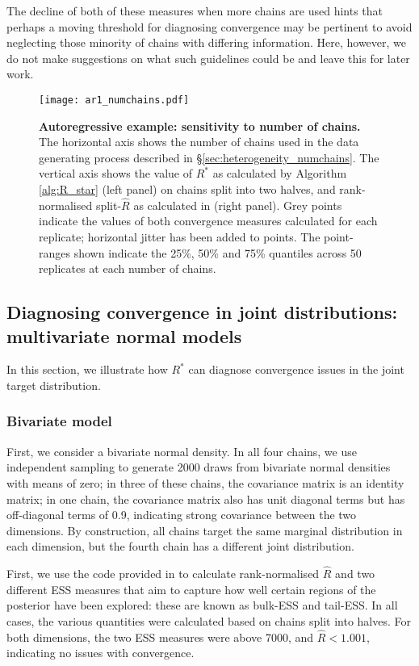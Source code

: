 \documentclass{article}
\begin{document}
The decline of both of these measures when more chains are used hints that perhaps a moving threshold for diagnosing convergence may be pertinent to avoid neglecting those minority of chains with differing information. Here, however, we do not make suggestions on what such guidelines could be and leave this for later work.

\begin{figure}[!htb]
	\centerline{\texttt{[image: ar1\_numchains.pdf]}}
	\caption{\textbf{Autoregressive example: sensitivity to number of chains.} The horizontal axis shows the number of chains used in the data generating process described in \S\ref{sec:heterogeneity_numchains}. The vertical axis shows the value of $R^*$ as calculated by Algorithm \ref{alg:R_star} (left panel) on chains split into two halves, and rank-normalised split-$\widehat{R}$ as calculated in \cite{vehtari2019rank} (right panel). Grey points indicate the values of both convergence measures calculated for each replicate; horizontal jitter has been added to points. The point-ranges shown indicate the 25\%, 50\% and 75\% quantiles across 50 replicates at each number of chains.}
	\label{fig:ar1_numchains}
\end{figure}

\color{black}
\subsection{Diagnosing convergence in joint distributions: multivariate normal models}\label{sec:multivariate_normal}
In this section, we illustrate how $R^*$ can diagnose convergence issues in the joint target distribution.

\subsubsection{Bivariate model}\label{sec:multivariate_normal_bivariate}
First, we consider a bivariate normal density. In all four chains, we use independent sampling to generate 2000 draws from bivariate normal densities with means of zero; in three of these chains, the covariance matrix is an identity matrix; in one chain, the covariance matrix also has unit diagonal terms but has off-diagonal terms of 0.9, indicating strong covariance between the two dimensions. By construction, all chains target the same marginal distribution in each dimension, but the fourth chain has a different joint distribution.

First, we use the code provided in \cite{vehtari2019rank} to calculate rank-normalised $\widehat{R}$ and two different ESS measures that aim to capture how well certain regions of the posterior have been explored: these are known as bulk-ESS and tail-ESS. In all cases, the various quantities were calculated based on chains split into halves. For both dimensions, the two ESS measures were above 7000, and $\widehat{R}<1.001$, indicating no issues with convergence.
\end{document}

